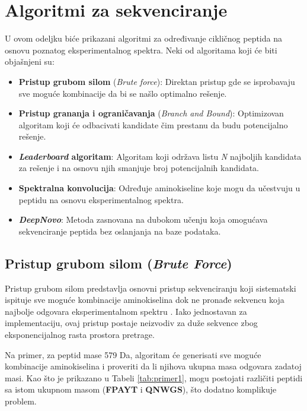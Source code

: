 \documentclass[12pt,oneside]{memoir}
\begin{document}
\chapter{Algoritmi za sekvenciranje}
U ovom odeljku biće prikazani algoritmi za određivanje cikličnog peptida na osnovu poznatog eksperimentalnog spektra. Neki od algoritama koji će biti objašnjeni su:
\begin{itemize}
    \item \textbf{Pristup grubom silom} (\emph{Brute force}): Direktan pristup gde se isprobavaju sve moguće kombinacije da bi se našlo optimalno rešenje.
    \item \textbf{Pristup grananja i ograničavanja} (\emph{Branch and Bound}): Optimizovan algoritam koji će odbacivati kandidate čim prestanu da budu potencijalno rešenje.
    \item \textbf{\emph{Leaderboard} algoritam}: Algoritam koji održava listu \emph{N} najboljih kandidata za rešenje i na osnovu njih smanjuje broj potencijalnih kandidata.
    \item \textbf{Spektralna konvolucija}: Određuje aminokiseline koje mogu da učestvuju u peptidu na osnovu eksperimentalnog spektra.
    \item \textbf{\emph{DeepNovo}}: Metoda zasnovana na dubokom učenju koja omogućava sekvenciranje peptida bez oslanjanja na baze podataka.
\end{itemize}

\section{Pristup grubom silom (\emph{Brute Force})}
Pristup grubom silom predstavlja osnovni pristup sekvenciranju koji sistematski ispituje sve moguće kombinacije aminokiselina dok ne pronađe sekvencu koja najbolje odgovara eksperimentalnom spektru \cite{online_lecture, online_book}. Iako jednostavan za implementaciju, ovaj pristup postaje neizvodiv za duže sekvence zbog eksponencijalnog rasta prostora pretrage.

Na primer, za peptid mase 579 Da, algoritam će generisati sve moguće kombinacije aminokiselina i proveriti da li njihova ukupna masa odgovara zadatoj masi. Kao što je prikazano u Tabeli \ref{tab:primer1}, mogu postojati različiti peptidi sa istom ukupnom masom (\textbf{FPAYT} i \textbf{QNWGS}), što dodatno komplikuje problem.
\end{document}
